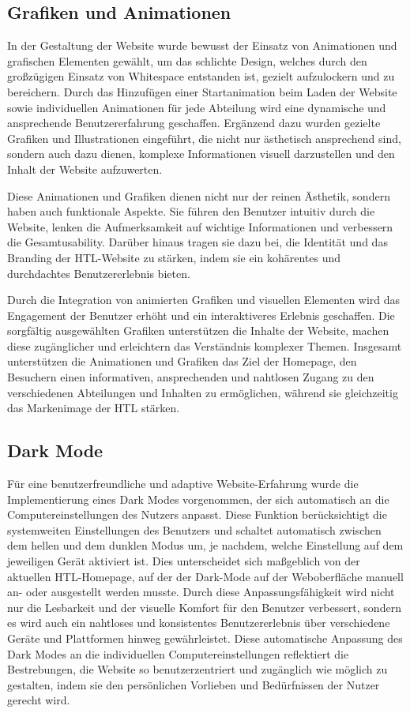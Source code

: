 \subsection{Grafiken und Animationen}
In der Gestaltung der Website wurde bewusst der Einsatz von Animationen und grafischen Elementen gewählt, 
um das schlichte Design, welches durch den großzügigen Einsatz von Whitespace entstanden ist, gezielt aufzulockern und 
zu bereichern. Durch das Hinzufügen einer Startanimation beim Laden der Website sowie individuellen Animationen für jede 
Abteilung wird eine dynamische und ansprechende Benutzererfahrung geschaffen. Ergänzend dazu wurden gezielte Grafiken und 
Illustrationen eingeführt, die nicht nur ästhetisch ansprechend sind, sondern auch dazu dienen, komplexe Informationen visuell 
darzustellen und den Inhalt der Website aufzuwerten.

Diese Animationen und Grafiken dienen nicht nur der reinen Ästhetik, sondern haben auch funktionale Aspekte. 
Sie führen den Benutzer intuitiv durch die Website, lenken die Aufmerksamkeit auf wichtige Informationen und verbessern die 
Gesamtusability. Darüber hinaus tragen sie dazu bei, die Identität und das Branding der HTL-Website zu stärken, indem sie ein 
kohärentes und durchdachtes Benutzererlebnis bieten.

Durch die Integration von animierten Grafiken und visuellen Elementen wird das Engagement der Benutzer erhöht und ein 
interaktiveres Erlebnis geschaffen. Die sorgfältig ausgewählten Grafiken unterstützen die Inhalte der Website, machen diese 
zugänglicher und erleichtern das Verständnis komplexer Themen. Insgesamt unterstützen die Animationen und Grafiken das Ziel der Homepage, 
den Besuchern einen informativen, ansprechenden und nahtlosen Zugang zu den verschiedenen Abteilungen und Inhalten zu ermöglichen, 
während sie gleichzeitig das Markenimage der HTL stärken.


\subsection{Dark Mode}

Für eine benutzerfreundliche und adaptive Website-Erfahrung wurde die Implementierung eines Dark Modes vorgenommen, 
der sich automatisch an die Computereinstellungen des Nutzers anpasst. Diese Funktion berücksichtigt die systemweiten Einstellungen 
des Benutzers und schaltet automatisch zwischen dem hellen und dem dunklen Modus um, je nachdem, welche Einstellung auf dem jeweiligen 
Gerät aktiviert ist. Dies unterscheidet sich maßgeblich von der aktuellen HTL-Homepage, auf der der Dark-Mode auf der Weboberfläche manuell
an- oder ausgestellt werden musste. Durch diese Anpassungsfähigkeit wird nicht nur die Lesbarkeit und der visuelle Komfort für den Benutzer 
verbessert, sondern es wird auch ein nahtloses und konsistentes Benutzererlebnis über verschiedene Geräte und Plattformen hinweg 
gewährleistet. Diese automatische Anpassung des Dark Modes an die individuellen Computereinstellungen reflektiert die Bestrebungen, 
die Website so benutzerzentriert und zugänglich wie möglich zu gestalten, indem sie den persönlichen Vorlieben und Bedürfnissen der
Nutzer gerecht wird.

